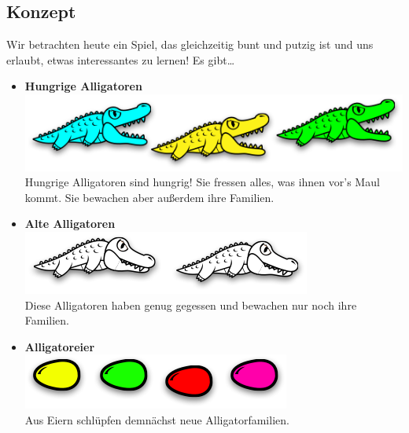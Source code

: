 \documentclass{beamer}
\begin{document}
\subsection*{Konzept}

\begin{frame}
Wir betrachten heute ein Spiel, das gleichzeitig bunt und putzig ist und uns erlaubt,
etwas interessantes zu lernen! Es gibt\dots \pause\smallskip

\begin{itemize}
\item \textbf{Hungrige Alligatoren}\\
      \includegraphics[scale=0.2]{pieces_1.png}\\
      Hungrige Alligatoren sind hungrig! Sie fressen alles, was ihnen vor's Maul kommt.
      Sie bewachen aber außerdem ihre Familien.
      \pause
\item \textbf{Alte Alligatoren}\\
      \includegraphics[scale=0.2]{pieces_2.png}\\
      Diese Alligatoren haben genug gegessen und bewachen nur noch ihre Familien.
      \pause
\item \textbf{Alligatoreier}\\
      \includegraphics[scale=0.2]{pieces_3.png}\\
      Aus Eiern schlüpfen demnächst neue Alligatorfamilien.
\end{itemize}

\end{frame}

\end{document}
